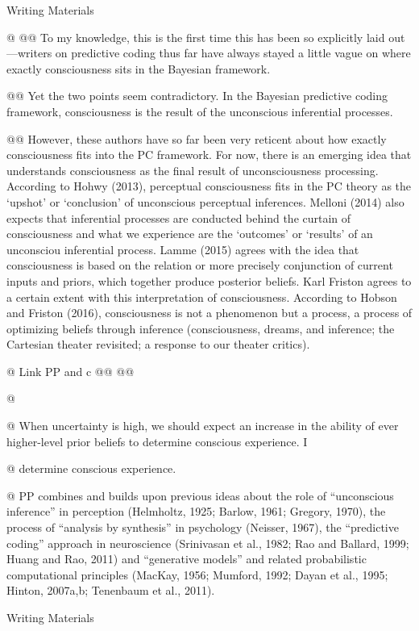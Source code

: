 \documentclass[utf8]{article}
\newenvironment{writingMaterials}
			{	
			\begin{tcolorbox}[size=small, colframe=black!20!white, toprule=1mm]
				Writing Materials
			\end{tcolorbox}
			
			\begin{easylist}[itemize]		
			}
			{
			\end{easylist}
			\begin{tcolorbox}[size=small, bottomrule=1mm, halign=flush right, colframe=black!20!white]
				Writing Materials
			\end{tcolorbox}			
			}
\begin{document}
		
			\begin{writingMaterials}
				
				@ \cite{lamme2015predictive}
					@@ To my knowledge, this is the first time this has been so explicitly laid out—writers on predictive coding thus far have always stayed a little vague on where exactly consciousness sits in the Bayesian framework.
					
					@@ Yet the two points seem contradictory. In the Bayesian predictive coding framework, consciousness is the result of the unconscious inferential processes. 
					
					
					@@ However, these authors have so far been very reticent about how exactly consciousness ﬁts into the PC framework. For now, there is an emerging idea that understands consciousness as the ﬁnal result of unconsciousness processing. According to Hohwy (2013), perceptual consciousness ﬁts in the PC theory as the ‘upshot’ or ‘conclusion’ of unconscious perceptual inferences. Melloni (2014) also expects that inferential processes are conducted behind the curtain of consciousness and what we experience are the ‘outcomes’ or ‘results’ of an unconsciou inferential process. Lamme (2015) agrees with the idea that consciousness is based on the relation or more precisely conjunction of current inputs and priors, which together produce posterior beliefs. Karl Friston agrees to a certain extent with this interpretation of consciousness. According to Hobson and Friston (2016), consciousness is not a phenomenon but a process, a process of optimizing beliefs through inference (consciousness, dreams, and inference; the Cartesian theater revisited; a response to our theater critics).
				
				
				@ Link PP and c
					@@ \cite{hobson2016response}
					@@ \cite{Melloni2015}
				
				@ \cite{SethPP2014} 
				
				@ When uncertainty is high, we should expect an increase in the ability of ever higher-level prior beliefs to determine conscious experience. I
				
				@ determine conscious experience. 
				
				@ PP combines and builds upon previous ideas about the role of “unconscious inference” in perception (Helmholtz, 1925; Barlow, 1961; Gregory, 1970), the process of “analysis by synthesis” in psychology (Neisser, 1967), the “predictive coding” approach in neuroscience (Srinivasan et al., 1982; Rao and Ballard, 1999; Huang and Rao, 2011) and “generative models” and related probabilistic computational principles (MacKay, 1956; Mumford, 1992; Dayan et al., 1995; Hinton, 2007a,b; Tenenbaum et al., 2011). 
				

\end{writingMaterials}
\end{document}

